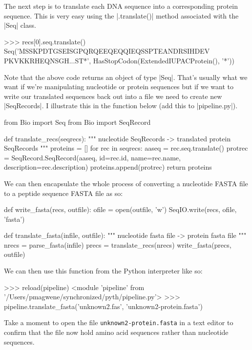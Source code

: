 \documentclass[10pt,letterpaper]{scrartcl}
\begin{document}
The next step is to translate each  DNA sequence into a corresponding protein sequence. This is very easy using the |.translate()| method associated with the |Seq| class.

\begin{python}
>>> recs[0].seq.translate()
Seq('MSSKPDTGSEISGPQRQEEQEQQIEQSSPTEANDRSIHDEV
PKVKKRHEQNSGH...ST*', HasStopCodon(ExtendedIUPACProtein(), '*'))
\end{python}
%
Note that the above code returns an object of type |Seq|. That's usually what we want if we're manipulating nucleotide or protein sequences but if we want to write our translated sequences back out into a file we need to create new |SeqRecords|. I illustrate this in the function below (add this to |pipeline.py|).

\begin{python}
from Bio import Seq
from Bio import SeqRecord

def translate_recs(seqrecs):
    """ nucleotide SeqRecords -> translated protein SeqRecords """ 
    proteins = []
    for rec in seqrecs:
        aaseq = rec.seq.translate()
        protrec = SeqRecord.SeqRecord(aaseq, id=rec.id, name=rec.name, 
        			      description=rec.description)
        proteins.append(protrec)
    return proteins
\end{python}    

We can then encapsulate the whole process of converting a nucleotide FASTA file to a peptide sequence FASTA file as so:

\begin{python}
def write_fasta(recs, outfile):
    ofile = open(outfile, 'w')
    SeqIO.write(recs, ofile, 'fasta')

def translate_fasta(infile, outfile):
    """ nucleotide fasta file -> protein fasta file """
    nrecs = parse_fasta(infile)
    precs = translate_recs(nrecs)
    write_fasta(precs, outfile)
\end{python}

We can then use this function from the Python interpreter like so:

\begin{python}
>>> reload(pipeline)
<module 'pipeline' from '/Users/pmagwene/synchronized/pyth/pipeline.py'>
>>> pipeline.translate_fasta('unknown2.fas', 'unknown2-protein.fasta')
\end{python}
%
Take a moment to open the file \texttt{unknown2-protein.fasta} in a text editor to confirm that the file now hold amino acid sequences rather than nucleotide sequences.
\end{document}
